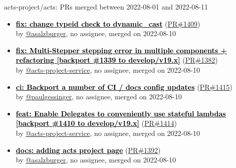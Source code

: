 \begin{frame}[allowframebreaks]{ acts-project/acts: PRs merged 
between 2022-08-01 and 2022-08-11
}
\begin{itemize}
    \item\prmerged
    \hspace*{0.1em}
    \textbf{\href{https://github.com/acts-project/acts/pull/1409}{\textcolor{black}{fix: change typeid check to dynamic\_cast}}}
    (\href{https://github.com/acts-project/acts/pull/1409}{PR\#1409}) \\
    by \href{https://github.com/asalzburger}{@asalzburger}, {}no assignee, merged on 2022-08-10

    \item\prmerged
    \hspace*{0.1em}
    \textbf{\href{https://github.com/acts-project/acts/pull/1382}{\textcolor{black}{fix: Multi-Stepper stepping error in multiple components + refactoring [backport \#1339 to develop/v19.x]}}}
    (\href{https://github.com/acts-project/acts/pull/1382}{PR\#1382}) \\
    by \href{https://github.com/acts-project-service}{@acts-project-service}, {}no assignee, merged on 2022-08-10

    \item\prmerged
    \hspace*{0.1em}
    \textbf{\href{https://github.com/acts-project/acts/pull/1415}{\textcolor{black}{ci: Backport a number of CI / docs config updates}}}
    (\href{https://github.com/acts-project/acts/pull/1415}{PR\#1415}) \\
    by \href{https://github.com/paulgessinger}{@paulgessinger}, {}no assignee, merged on 2022-08-10

    \item\prmerged
    \hspace*{0.1em}
    \textbf{\href{https://github.com/acts-project/acts/pull/1414}{\textcolor{black}{feat: Enable Delegates to conveniently use stateful lambdas [backport \#1410 to develop/v19.x]}}}
    (\href{https://github.com/acts-project/acts/pull/1414}{PR\#1414}) \\
    by \href{https://github.com/acts-project-service}{@acts-project-service}, {}no assignee, merged on 2022-08-10

    \item\prmerged
    \hspace*{0.1em}
    \textbf{\href{https://github.com/acts-project/acts/pull/1392}{\textcolor{black}{docs: adding acts project page}}}
    (\href{https://github.com/acts-project/acts/pull/1392}{PR\#1392}) \\
    by \href{https://github.com/asalzburger}{@asalzburger}, {}no assignee, merged on 2022-08-10


\end{itemize}
\end{frame}
